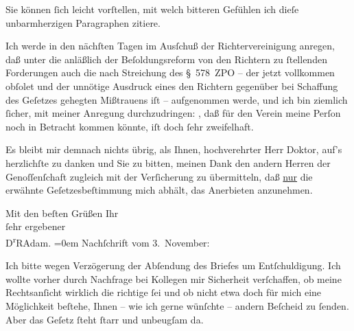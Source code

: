 \pstart
           Sie können{ }ſich leicht vorſtellen, mit welch bitteren Gefühlen ich dieſe
               unbarmherzigen Paragraphen zitiere.\pend
           
\pstart
           Ich werde in den nächſten Tagen im Ausſchuß der Richtervereinigung anregen, daß unter die anläßlich der Beſoldungsreform von
               den Richtern zu{ }ſtellenden Forderungen auch die nach Streichung des § 578 ZPO – der
               jetzt vollkommen obſolet und der unnötige Ausdruck eines den Richtern gegenüber bei
               Schaffung des Geſetzes gehegten Mißtrauens iſt – aufgenommen werde, und ich bin
               ziemlich{ }ſicher, mit meiner Anregung durchzudringen: \label{K_L02357-1v}\label{K_L02357-1}, daß für den Verein meine Perſon noch in Betracht kommen
               könnte, iſt doch{ }ſehr zweifelhaft.\pend
           
\pstart
           {\pb}Es bleibt mir demnach nichts übrig, als
               Ihnen, hochverehrter Herr Doktor, auf’s herzlichſte zu danken und Sie zu bitten,
               meinen Dank den andern Herren der Genoſſenſchaft zugleich mit der Verſicherung zu übermitteln, daß \uline{nur} die erwähnte Geſetzesbeſtimmung mich abhält, das
               Anerbieten anzunehmen.\pend
           
\pstart
           Mit den beſten Grüßen Ihr{\\[\baselineskip]}ſehr ergebener{\\[\baselineskip]}\spacefill\mbox{D\textsuperscript{r}RAdam.}\pend
           \leftskip=0em{}\vspace{1em}
\pstart
           \noindent{}Nachſchrift vom 3. November:\pend
           
\pstart
           Ich bitte wegen Verzögerung der Abſendung des Briefes um Entſchuldigung. Ich wollte
               vorher durch Nachfrage bei Kollegen mir Sicherheit verſchaffen, ob meine
               Rechtsanſicht wirklich die richtige{ }ſei und ob nicht etwa doch für mich eine
               Möglichkeit beſtehe, Ihnen – wie ich gerne wünſchte – andern Beſcheid zu{ }ſenden. Aber
                  {\pb}das Geſetz{ }ſteht{ }ſtarr und unbeugſam
               da.\pend
           
